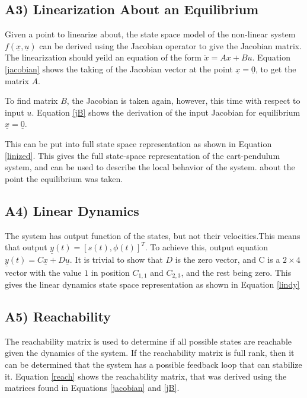 \documentclass{article}
\begin{document}
\subsection*{A3) Linearization About an Equilibrium}
Given a point to linearize about, the state space model of the non-linear system $f(\underline{x},\underline{u})$ can be derived using the Jacobian operator to give the Jacobian matrix. The linearization should yeild an equation of the form $\dot x = Ax+Bu$. Equation \ref{jacobian} shows the taking of the Jacobian vector at the point $\underline{x}=\underline{0}$, to get the matrix $A$.



To find matrix $B$, the Jacobian is taken again, however, this time with respect to input $u$. Equation \ref{jB} shows the derivation of the input Jacobian for equilibrium $\underline{x}=\underline{0}$.




This can be put into full state space representation as shown in Equation \ref{linized}. This gives the full state-space representation of the cart-pendulum system, and can be used to describe the local behavior of the system. about the point the equilibrium was taken.


\subsection*{A4) Linear Dynamics}
The system has output function of the states, but not their velocities.This means that output $\underline{y}(t)=[s(t), \phi(t)]^T$. To achieve this, output equation $\underline{y}(t)=C\underline{x}+D\underline{u}$. It is trivial to show that $D$ is the zero vector, and C is a $2\times4$ vector with  the value $1$ in position $C_{1,1}$ and $C_{2,3}$, and the rest being zero. This gives the linear dynamics state space representation as shown in Equation \ref{lindy}



\subsection*{A5) Reachability}
The reachability matrix is used to determine if all possible states are reachable given the dynamics of the system. If the reachability matrix is full rank, then it can be determined that the system has a possible feedback loop that can stabilize it. Equation \ref{reach} shows the reachability matrix, that was derived using the matrices found in Equations \ref{jacobian} and \ref{jB}.
\end{document}
